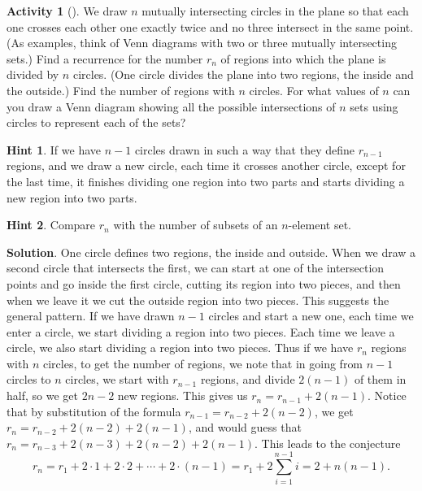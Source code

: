 \documentclass[10pt,]{book}
\theoremstyle{plain}
\theoremstyle{definition}
\theoremstyle{definition}
\theoremstyle{definition}
\newtheorem{activity}[project]{Activity}
\numberwithin{equation}{chapter}
\begin{document}
\begin{activity}[]\label{circlesinplane}
\hypertarget{p-903}{}%
We draw \(n\) mutually intersecting circles in the plane so that each one crosses each other one exactly twice and no three intersect in the same point. (As examples, think of Venn diagrams with two or three mutually intersecting sets.) Find a recurrence for the number \(r_n\) of regions into which the plane is divided by \(n\) circles. (One circle divides the plane into two regions, the inside and the outside.) Find the number of regions with \(n\) circles. For what values of \(n\) can you draw a Venn diagram showing all the possible intersections of \(n\) sets using circles to represent each of the sets?%
\par\smallskip%
\noindent\textbf{Hint 1}.\hypertarget{hint-96}{}\quad%
\hypertarget{p-904}{}%
If we have \(n - 1\) circles drawn in such a way that they define \(r_{n-1}\) regions, and we draw a new circle, each time it crosses another circle, except for the last time, it finishes dividing one region into two parts and starts dividing a new region into two parts.%
\par\smallskip%
\noindent\textbf{Hint 2}.\hypertarget{hint-97}{}\quad%
\hypertarget{p-905}{}%
Compare \(r_n\) with the number of subsets of an \(n\)-element set.%
\par\smallskip%
\noindent\textbf{Solution}.\hypertarget{solution-74}{}\quad%
\hypertarget{p-906}{}%
One circle defines two regions, the inside and outside. When we draw a second circle that intersects the first, we can start at one of the intersection points and go inside the first circle, cutting its region into two pieces, and then when we leave it we cut the outside region into two pieces. This suggests the general pattern. If we have drawn \(n-1\) circles and start a new one, each time we enter a circle, we start dividing a region into two pieces. Each time we leave a circle, we also start dividing a region into two pieces. Thus if we have \(r_n\) regions with \(n\) circles, to get the number of regions, we note that in going from \(n-1\) circles to \(n\) circles, we start with \(r_{n-1}\) regions, and divide \(2(n-1)\) of them in half, so we get \(2n-2\) new regions. This gives us \(r_n=r_{n-1}+2(n-1)\). Notice that by substitution of the formula \(r_{n-1}=r_{n-2} +2(n-2)\), we get \(r_n=r_{n-2}+ 2(n-2) +2(n-1)\), and would guess that \(r_n=r_{n-3}+2(n-3)+2(n-2) +2(n-1)\). This leads to the conjecture%
\begin{equation*}
r_n=r_1  +2\cdot1+2\cdot2+\cdots+2\cdot(n-1)=r_1+2\sum_{i=1}^{n-1}   i=2+n(n-1). 

\end{equation*}
\end{activity}
\end{document}
